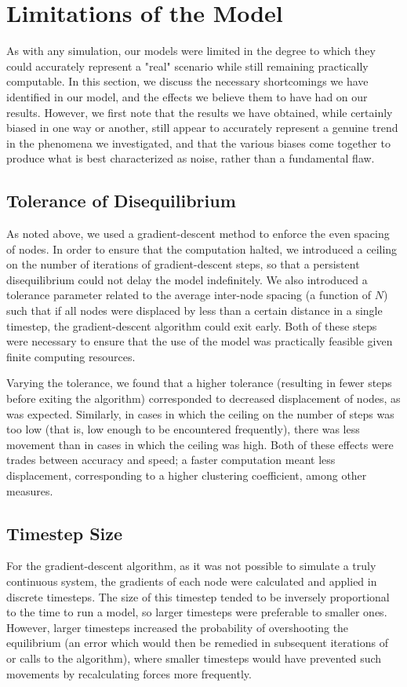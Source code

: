 \documentclass[aps,pre,reprint,superscriptaddress,amsmath,amssymb,nofootinbib]{revtex4-1}
\begin{document}
\section{Limitations of the Model}
As with any simulation, our models were limited in the degree to which they could accurately represent a "real" scenario while still remaining practically computable.  
In this section, we discuss the necessary shortcomings we have identified in our model, and the effects we believe them to have had on our results.  
However, we first note that the results we have obtained, while certainly biased in one way or another, still appear to accurately represent a genuine trend in the phenomena we investigated, and that the various biases come together to produce what is best characterized as noise, rather than a fundamental flaw.

\subsection{Tolerance of Disequilibrium}
As noted above, we used a gradient-descent method to enforce the even spacing of nodes.  
In order to ensure that the computation halted, we introduced a ceiling on the number of iterations of gradient-descent steps, so that a persistent disequilibrium could not delay the model indefinitely.  
We also introduced a tolerance parameter related to the average inter-node spacing (a function of $N$) such that if all nodes were displaced by less than a certain distance in a single timestep, the gradient-descent algorithm could exit early.  
Both of these steps were necessary to ensure that the use of the model was practically feasible given finite computing resources.

Varying the tolerance, we found that a higher tolerance (resulting in fewer steps before exiting the algorithm) corresponded to decreased displacement of nodes, as was expected.  
Similarly, in cases in which the ceiling on the number of steps was too low (that is, low enough to be encountered frequently), there was less movement than in cases in which the ceiling was high.  
Both of these effects were trades between accuracy and speed; a faster computation meant less displacement, corresponding to a higher clustering coefficient, among other measures.

\subsection{Timestep Size}
For the gradient-descent algorithm, as it was not possible to simulate a truly continuous system, the gradients of each node were calculated and applied in discrete timesteps.  
The size of this timestep tended to be inversely proportional to the time to run a model, so larger timesteps were preferable to smaller ones.  
However, larger timesteps increased the probability of overshooting the equilibrium (an error which would then be remedied in subsequent iterations of or calls to the algorithm), where smaller timesteps would have prevented such movements by recalculating forces more frequently.
\end{document}
